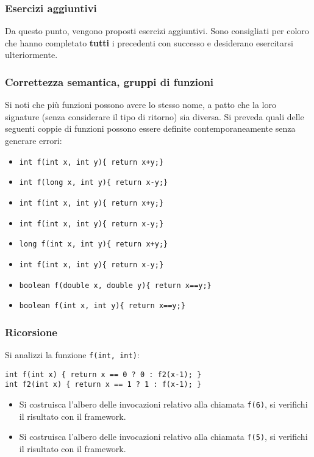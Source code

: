 \documentclass{beamer}
\begin{document}
\begin{frame}[fragile]
\frametitle{Esercizi aggiuntivi}
Da questo punto, vengono proposti esercizi aggiuntivi. Sono consigliati per coloro che hanno completato \textbf{tutti} i precedenti con successo e desiderano esercitarsi ulteriormente.
\end{frame}

\begin{frame}
\frametitle{Correttezza semantica, gruppi di funzioni}
Si noti che più funzioni possono avere lo stesso nome, a patto che la loro signature (senza considerare il tipo di ritorno) sia diversa. Si preveda quali delle seguenti coppie di funzioni possono essere definite contemporaneamente senza generare errori:
\begin{itemize}
 \item \texttt{int f(int x, int y)\{ return x+y;\}}
 \item \texttt{int f(long x, int y)\{ return x-y;\}}
\end{itemize}
\begin{itemize}
 \item \texttt{int f(int x, int y)\{ return x+y;\}}
 \item \texttt{int f(int x, int y)\{ return x-y;\}}
\end{itemize}
\begin{itemize}
 \item \texttt{long f(int x, int y)\{ return x+y;\}}
 \item \texttt{int f(int x, int y)\{ return x-y;\}}
\end{itemize}
\begin{itemize}
 \item \texttt{boolean f(double x, double y)\{ return x==y;\}}
 \item \texttt{boolean f(int x, int y)\{ return x==y;\}}
\end{itemize}
\end{frame}

\begin{frame}[fragile]
\frametitle{Ricorsione}
Si analizzi la funzione \texttt{f(int, int)}:
\begin{verbatim}
int f(int x) { return x == 0 ? 0 : f2(x-1); }
int f2(int x) { return x == 1 ? 1 : f(x-1); }
\end{verbatim}
\begin{itemize}
 \item Si costruisca l'albero delle invocazioni relativo alla chiamata \texttt{f(6)}, si verifichi il risultato con il framework.
 \item Si costruisca l'albero delle invocazioni relativo alla chiamata \texttt{f(5)}, si verifichi il risultato con il framework. 
\end{itemize}
\end{frame}
\end{document}
